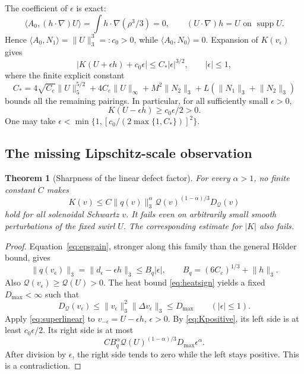 \documentclass[11pt,a4paper]{article}
\newtheorem{theorem}{Theorem}[section]
\theoremstyle{definition}
\theoremstyle{remark}
\newcommand{\Q}{\mathcal Q}
\newcommand{\norm}[1]{\lVert #1\rVert}
\newcommand{\ip}[2]{\langle #1,#2\rangle}
\newcommand{\supp}{\operatorname{supp}}
\numberwithin{equation}{section}
\begin{document}
The coefficient of \(\epsilon\) is exact:
\[
\ip{A_0}{(h\cdot\nabla)U}=\int h\cdot\nabla(\rho^3/3)=0,
\qquad (U\cdot\nabla)h=U\text{ on }\supp U.
\]
Hence \(\ip{A_0}{N_1}=\norm U_3^3=:c_0>0\), while \(\ip{A_0}{N_0}=0\). Expansion of \(K(v_\epsilon)\) gives
\begin{equation}\label{eq:Kexpansion}
|K(U+\epsilon h)+c_0\epsilon|\le C_*|\epsilon|^{3/2},\qquad |\epsilon|\le1,
\end{equation}
where the finite explicit constant
\[
C_*=4\sqrt{C_e}\norm U_5^{5/2}+4C_e\norm U_\infty
+M^2\norm{N_2}_3+L(\norm{N_1}_3+\norm{N_2}_3)
\]
bounds all the remaining pairings. In particular, for all sufficiently small \(\epsilon>0\),
\begin{equation}\label{eq:Kpositive}
K(U-\epsilon h)\ge c_0\epsilon/2>0.
\end{equation}
One may take \(\epsilon<\min\{1,[c_0/(2\max\{1,C_*\})]^2\}\).

\subsection{The missing Lipschitz-scale observation}
\begin{theorem}[Sharpness of the linear defect factor]\label{thm:alpha}
For every \(\alpha>1\), no finite constant \(C\) makes
\begin{equation}\label{eq:superlinear}
K(v)\le C\norm{q(v)}_3^\alpha\Q(v)^{(1-\alpha)/3}D_{\Q}(v)
\end{equation}
hold for all solenoidal Schwartz \(v\). It fails even on arbitrarily small smooth perturbations of the fixed swirl \(U\). The corresponding estimate for \(|K|\) also fails.
\end{theorem}
\begin{proof}
Equation~\eqref{eq:epsgain}, stronger along this family than the general Hölder bound, gives
\begin{equation}\label{eq:directionallip}
\norm{q(v_\epsilon)}_3
=\norm{d_\epsilon-\epsilon h}_3
\le B_q|\epsilon|,
\qquad B_q=(6C_e)^{1/3}+\norm h_3.
\end{equation}
Also \(\Q(v_\epsilon)\ge\Q(U)>0\). The heat bound \eqref{eq:heatsign} yields a fixed \(D_{\max}<\infty\) such that
\[
D_{\Q}(v_\epsilon)\le\norm{v_\epsilon}_3^2\norm{\Delta v_\epsilon}_3\le D_{\max}
\qquad(|\epsilon|\le1).
\]
Apply \eqref{eq:superlinear} to \(v_{-\epsilon}=U-\epsilon h\), \(\epsilon>0\). By \eqref{eq:Kpositive}, its left side is at least \(c_0\epsilon/2\). Its right side is at most
\[
C B_q^\alpha\Q(U)^{(1-\alpha)/3}D_{\max}\epsilon^\alpha.
\]
After division by \(\epsilon\), the right side tends to zero while the left stays positive. This is a contradiction.
\end{proof}
\end{document}
